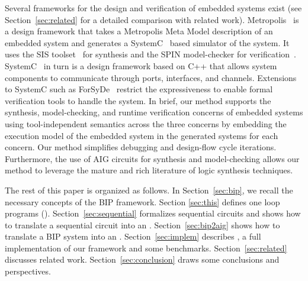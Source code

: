 
Several frameworks for the design and verification of embedded systems exist 
(see Section~\ref{sec:related} for a detailed comparison with related work).
%
Metropolis~\cite{metropolis1,metropolis2} is a design framework that
takes a Metropolis Meta Model description of an embedded system 
and generates a SystemC~\cite{systemc} based simulator of the system.
It uses the SIS toolset~\cite{brayton92sis} for synthesis and the SPIN model-checker for verification~\cite{HolzSpin97}. 
SystemC~\cite{systemc} in turn is a design framework based on C++ that allows
system components to communicate through ports, interfaces, and channels.
Extensions to SystemC such as ForSyDe~\cite{SanderJ04} restrict the 
expressiveness to enable formal verification tools to handle the system. 
In brief, our method supports the synthesis, model-checking, and runtime verification 
concerns of embedded systems using tool-independent semantics across the three concerns
by embedding the execution model of the embedded system in the generated systems 
for each concern. 
Our method simplifies debugging and design-flow cycle iterations. Furthermore, 
the use of AIG circuits for synthesis and model-checking allows our method to leverage
the mature and rich literature of logic synthesis techniques. 


The rest of this paper is organized as follows.
In Section~\ref{sec:bip}, we recall the necessary concepts of the BIP framework. Section \ref{sec:this} defines one loop programs (\caig).
Section~\ref{sec:sequential} formalizes sequential circuits and shows how to translate a sequential circuit into an \caig.
Section~\ref{sec:bip2aig} shows how to translate a BIP system into an \caig.
Section~\ref{sec:implem} describes \biptool{}, a full implementation of our framework and some benchmarks.
Section~\ref{sec:related} discusses related work.
Section~\ref{sec:conclusion} draws some conclusions and perspectives.
%
